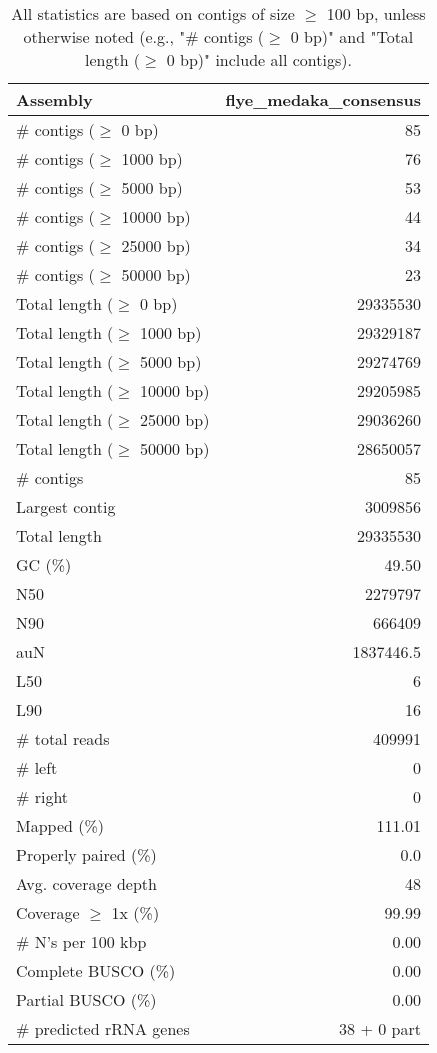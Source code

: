 \documentclass[12pt,a4paper]{article}
\begin{document}
\begin{table}[ht]
\begin{center}
\caption{All statistics are based on contigs of size $\geq$ 100 bp, unless otherwise noted (e.g., "\# contigs ($\geq$ 0 bp)" and "Total length ($\geq$ 0 bp)" include all contigs).}
\begin{tabular}{|l*{1}{|r}|}
\hline
Assembly & flye\_medaka\_consensus \\ \hline
\# contigs ($\geq$ 0 bp) & 85 \\ \hline
\# contigs ($\geq$ 1000 bp) & 76 \\ \hline
\# contigs ($\geq$ 5000 bp) & 53 \\ \hline
\# contigs ($\geq$ 10000 bp) & 44 \\ \hline
\# contigs ($\geq$ 25000 bp) & 34 \\ \hline
\# contigs ($\geq$ 50000 bp) & 23 \\ \hline
Total length ($\geq$ 0 bp) & 29335530 \\ \hline
Total length ($\geq$ 1000 bp) & 29329187 \\ \hline
Total length ($\geq$ 5000 bp) & 29274769 \\ \hline
Total length ($\geq$ 10000 bp) & 29205985 \\ \hline
Total length ($\geq$ 25000 bp) & 29036260 \\ \hline
Total length ($\geq$ 50000 bp) & 28650057 \\ \hline
\# contigs & 85 \\ \hline
Largest contig & 3009856 \\ \hline
Total length & 29335530 \\ \hline
GC (\%) & 49.50 \\ \hline
N50 & 2279797 \\ \hline
N90 & 666409 \\ \hline
auN & 1837446.5 \\ \hline
L50 & 6 \\ \hline
L90 & 16 \\ \hline
\# total reads & 409991 \\ \hline
\# left & 0 \\ \hline
\# right & 0 \\ \hline
Mapped (\%) & 111.01 \\ \hline
Properly paired (\%) & 0.0 \\ \hline
Avg. coverage depth & 48 \\ \hline
Coverage $\geq$ 1x (\%) & 99.99 \\ \hline
\# N's per 100 kbp & 0.00 \\ \hline
Complete BUSCO (\%) & 0.00 \\ \hline
Partial BUSCO (\%) & 0.00 \\ \hline
\# predicted rRNA genes & 38 + 0 part \\ \hline
\end{tabular}
\end{center}
\end{table}
\end{document}
